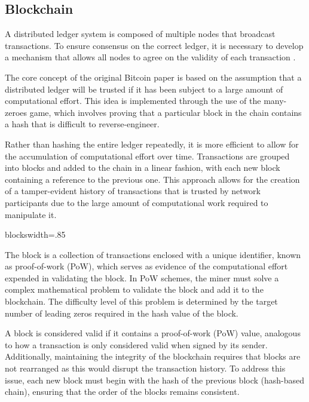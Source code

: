 \subsection{Blockchain}
A distributed ledger system is composed of multiple nodes that broadcast transactions. To ensure consensus on the correct ledger, it is
necessary to develop a mechanism that allows all nodes to agree on the validity of each transaction \cite{el2018review}.

The core concept of the original Bitcoin paper \cite{nakamoto2008bitcoin} is based on the assumption that a distributed ledger will be
trusted if it has been subject to a large amount of computational effort. This idea is implemented through the use of the many-zeroes
game, which involves proving that a particular block in the chain contains a hash that is difficult to reverse-engineer.

Rather than hashing the entire ledger repeatedly, it is more efficient to allow for the accumulation of computational effort over time.
Transactions are grouped into blocks and added to the chain in a linear fashion, with each new block containing a reference to the
previous one. This approach allows for the creation of a tamper-evident history of transactions that is trusted by network participants
due to the large amount of computational work required to manipulate it.

{blocks}{width=.85\textwidth}%

The block is a collection of transactions enclosed with a unique identifier, known as proof-of-work (PoW), which serves as evidence of
the computational effort expended in validating the block. In PoW schemes, the miner must solve a complex mathematical problem to validate
the block and add it to the blockchain. The difficulty level of this problem is determined by the target number of leading zeros required
in the hash value of the block.

A block is considered valid if it contains a proof-of-work (PoW) value, analogous to how a transaction is only considered valid when signed
by its sender. Additionally, maintaining the integrity of the blockchain requires that blocks are not rearranged as this would disrupt the
transaction history. To address this issue, each new block must begin with the hash of the previous block (hash-based chain), ensuring that
the order of the blocks remains consistent.

%
